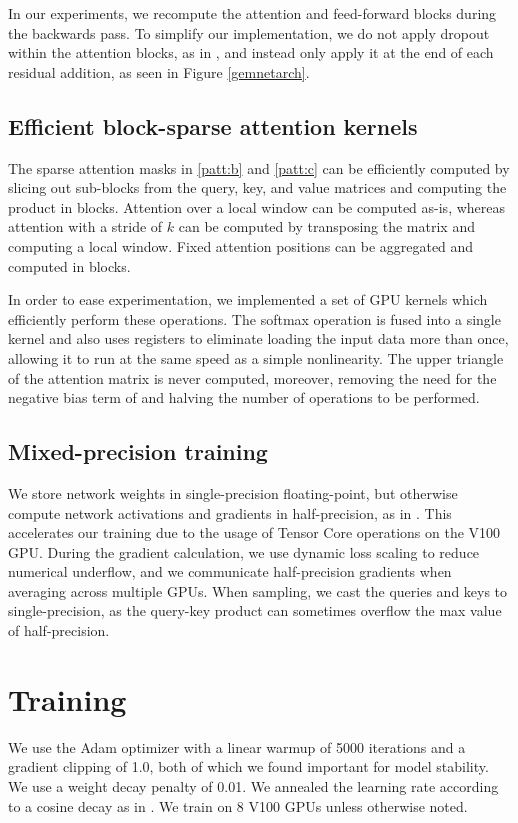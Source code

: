 \documentclass{article}
\begin{document}
In our experiments, we recompute the attention and feed-forward blocks during the backwards pass. To simplify our implementation, we do not apply dropout within the attention blocks, as in \cite{vaswani2017attention}, and instead only apply it at the end of each residual addition, as seen in Figure \ref{gemnetarch}.

\subsection{Efficient block-sparse attention kernels}
The sparse attention masks in \ref{patt:b} and \ref{patt:c} can be efficiently computed by slicing out sub-blocks from the query, key, and value matrices and computing the product in blocks. Attention over a local window can be computed as-is, whereas attention with a stride of $k$ can be computed by transposing the matrix and computing a local window. Fixed attention positions can be aggregated and computed in blocks.

In order to ease experimentation, we implemented a set of GPU kernels which efficiently perform these operations. The softmax operation is fused into a single kernel and also uses registers to eliminate loading the input data more than once, allowing it to run at the same speed as a simple nonlinearity. The upper triangle of the attention matrix is never computed, moreover, removing the need for the negative bias term of \cite{vaswani2017attention} and halving the number of operations to be performed.

\subsection{Mixed-precision training}
We store network weights in single-precision floating-point, but otherwise compute network activations and gradients in half-precision, as in \cite{micikevicius2017mixed}. This accelerates our training due to the usage of Tensor Core operations on the V100 GPU. During the gradient calculation, we use dynamic loss scaling to reduce numerical underflow, and we communicate half-precision gradients when averaging across multiple GPUs. When sampling, we cast the queries and keys to single-precision, as the query-key product can sometimes overflow the max value of half-precision.

\section{Training}
We use the Adam optimizer with a linear warmup of 5000 iterations and a gradient clipping of 1.0, both of which we found important for model stability. We use a weight decay penalty of 0.01. We annealed the learning rate according to a cosine decay as in \cite{radford2018}. We train on 8 V100 GPUs unless otherwise noted.
\end{document}
